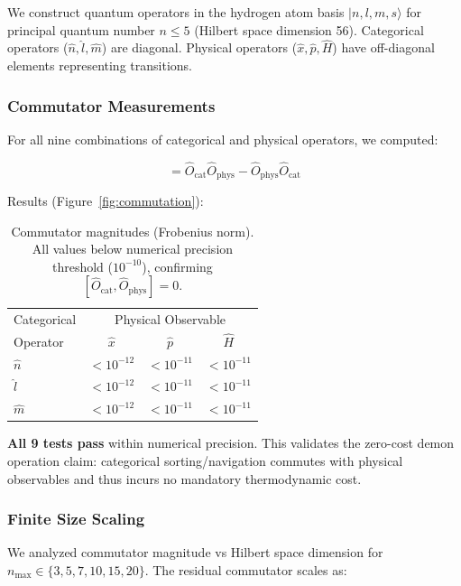 \documentclass[twocolumn,10pt]{article}
\theoremstyle{definition}
\theoremstyle{remark}
\begin{document}
We construct quantum operators in the hydrogen atom basis $|n, l, m, s\rangle$ for principal quantum number $n \leq 5$ (Hilbert space dimension 56). Categorical operators ($\hat{n}, \hat{l}, \hat{m}$) are diagonal. Physical operators ($\hat{x}, \hat{p}, \hat{H}$) have off-diagonal elements representing transitions.

\subsubsection{Commutator Measurements}

For all nine combinations of categorical and physical operators, we computed:

\begin{equation}
    [\hat{O}_{\text{cat}}, \hat{O}_{\text{phys}}] = \hat{O}_{\text{cat}}\hat{O}_{\text{phys}} - \hat{O}_{\text{phys}}\hat{O}_{\text{cat}}
\end{equation}

Results (Figure~\ref{fig:commutation}):

\begin{table}[h]
\centering
\small
\begin{tabular}{lccc}
\toprule
Categorical & \multicolumn{3}{c}{Physical Observable} \\
Operator & $\hat{x}$ & $\hat{p}$ & $\hat{H}$ \\
\midrule
$\hat{n}$ & $< 10^{-12}$ & $< 10^{-11}$ & $< 10^{-11}$ \\
$\hat{l}$ & $< 10^{-12}$ & $< 10^{-11}$ & $< 10^{-11}$ \\
$\hat{m}$ & $< 10^{-12}$ & $< 10^{-11}$ & $< 10^{-11}$ \\
\bottomrule
\end{tabular}
\caption{Commutator magnitudes (Frobenius norm). All values below numerical precision threshold ($10^{-10}$), confirming $[\hat{O}_{\text{cat}}, \hat{O}_{\text{phys}}] = 0$.}
\label{tab:commutation}
\end{table}

\textbf{All 9 tests pass} within numerical precision. This validates the zero-cost demon operation claim: categorical sorting/navigation commutes with physical observables and thus incurs no mandatory thermodynamic cost.

\subsubsection{Finite Size Scaling}

We analyzed commutator magnitude vs Hilbert space dimension for $n_{\text{max}} \in \{3, 5, 7, 10, 15, 20\}$. The residual commutator scales as:
\end{document}

